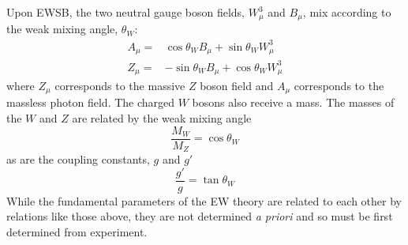 Upon EWSB, the two neutral gauge boson fields, $W_{\mu}^3$ and $B_{\mu}$, 
mix according to the weak mixing angle, $\theta_W$:
\begin{align}
A_{\mu} =& \cos\theta_W B_{\mu} + \sin\theta_W W_{\mu}^3 \\
Z_{\mu} =& -\sin\theta_W B_{\mu} + \cos\theta_W W_{\mu}^3
\end{align}
where $Z_{\mu}$ corresponds to the massive $Z$ boson field
and $A_{\mu}$ corresponds to the massless photon field.
The charged $W$ bosons also receive a mass.
The masses of the $W$ and $Z$ are related by the weak mixing angle
\begin{equation}
\frac{M_W}{M_Z} = \cos \theta_W
\end{equation}
as are the coupling constants, $g$ and $g'$
\begin{equation}
\frac{g'}{g} = \tan\theta_W
\end{equation}
While the fundamental parameters of the EW theory are related to each other
by relations
like those above, they are not determined \emph{a priori} 
and so must be first determined from experiment.

